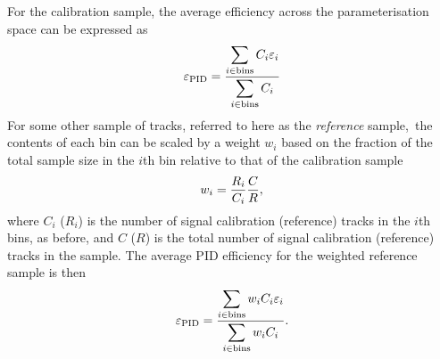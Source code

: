 
For the calibration sample, the average efficiency across the parameterisation 
space can be expressed as
\begin{equation}
  \effpid = \frac{%
    \displaystyle\sum_{i \in \textnormal{bins}} C_{i}\eff_{i}
    }{%
    \displaystyle\sum_{i \in \textnormal{bins}} C_{i}
    }
\end{equation}
For some other sample of tracks, referred to here as the \emph{reference} 
sample,\footnotemark\ the contents of each bin can be scaled by a weight 
$w_{i}$ based on the fraction of the total sample size in the $i$th bin 
relative to that of the calibration sample
\begin{equation}
  w_{i} = \frac{%
    R_{i}
  }{%
    C_{i}
  }\frac{%
    C
  }{%
    R
  },
  \label{eqn:prod:effs:pid:ref_weight}
\end{equation}
where $C_{i}$ ($R_{i}$) is the number of signal calibration (reference) tracks 
in the $i$th bins, as before, and $C$ ($R$) is the total number of signal 
calibration (reference) tracks in the sample.
The average \ac{PID} efficiency for the weighted reference sample is then
\begin{equation}
  \effpid = \frac{%
    \displaystyle\sum_{i \in \textnormal{bins}} w_{i}C_{i}\eff_{i}
  }{%
    \displaystyle\sum_{i \in \textnormal{bins}} w_{i}C_{i}
  }.
  \label{eqn:prod:effs:pid:single_track_ref_eff}
\end{equation}


